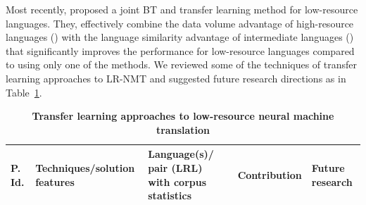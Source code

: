 \documentclass[manuscript,screen]{acmart}
\begin{document}
Most recently, \citet{luo2020joint} proposed a joint BT and transfer learning method for low-resource languages. They, effectively combine the data volume advantage of high-resource languages (\citet{kocmi2018trivial}) with the language similarity advantage of intermediate languages (\citet{luo2019hierarchical}) that significantly improves the performance for low-resource languages compared to using only one of the methods.
We reviewed some of the techniques of transfer learning approaches to LR-NMT and suggested future research directions as in Table~\ref{TLAppLRL-NMT}.

\begin{longtable}{|p{}|p{}|p{}|p{}|p{}|}
\caption{\bf {Transfer learning approaches to low-resource neural machine translation}}
\label{TLAppLRL-NMT}
 \hline
 \bf{P. Id.} & \bf{Techniques/solution features} & \bf{Language(s)/ pair (LRL) with corpus statistics} & \centering \bf{Contribution} & \bf{Future research} \\
 \hline
 

\end{longtable}
\end{document}
